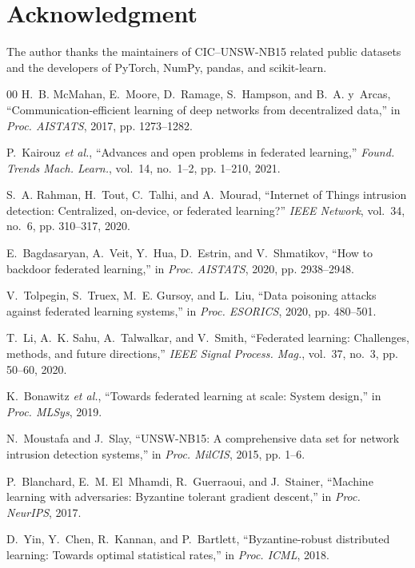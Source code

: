 \documentclass[journal]{IEEEtran}
\begin{document}
\section*{Acknowledgment}
The author thanks the maintainers of CIC--UNSW-NB15 related public datasets and the developers of PyTorch, NumPy, pandas, and scikit-learn.

\begin{thebibliography}{00}
H.~B. McMahan, E.~Moore, D.~Ramage, S.~Hampson, and B.~A. y~Arcas,
``Communication-efficient learning of deep networks from decentralized data,''
in \emph{Proc. AISTATS}, 2017, pp. 1273--1282.

P.~Kairouz \textit{et al.},
``Advances and open problems in federated learning,''
\emph{Found. Trends Mach. Learn.}, vol.~14, no.~1--2, pp. 1--210, 2021.

S.~A. Rahman, H.~Tout, C.~Talhi, and A.~Mourad,
``Internet of Things intrusion detection: Centralized, on-device, or federated learning?''
\emph{IEEE Network}, vol.~34, no.~6, pp. 310--317, 2020.

E.~Bagdasaryan, A.~Veit, Y.~Hua, D.~Estrin, and V.~Shmatikov,
``How to backdoor federated learning,''
in \emph{Proc. AISTATS}, 2020, pp. 2938--2948.

V.~Tolpegin, S.~Truex, M.~E. Gursoy, and L.~Liu,
``Data poisoning attacks against federated learning systems,''
in \emph{Proc. ESORICS}, 2020, pp. 480--501.

T.~Li, A.~K. Sahu, A.~Talwalkar, and V.~Smith,
``Federated learning: Challenges, methods, and future directions,''
\emph{IEEE Signal Process. Mag.}, vol.~37, no.~3, pp. 50--60, 2020.

K.~Bonawitz \textit{et al.},
``Towards federated learning at scale: System design,''
in \emph{Proc. MLSys}, 2019.

N.~Moustafa and J.~Slay,
``UNSW-NB15: A comprehensive data set for network intrusion detection systems,''
in \emph{Proc. MilCIS}, 2015, pp. 1--6.

P.~Blanchard, E.~M. El~Mhamdi, R.~Guerraoui, and J.~Stainer,
``Machine learning with adversaries: Byzantine tolerant gradient descent,''
in \emph{Proc. NeurIPS}, 2017.

D.~Yin, Y.~Chen, R.~Kannan, and P.~Bartlett,
``Byzantine-robust distributed learning: Towards optimal statistical rates,''
in \emph{Proc. ICML}, 2018.


\end{thebibliography}
\end{document}
